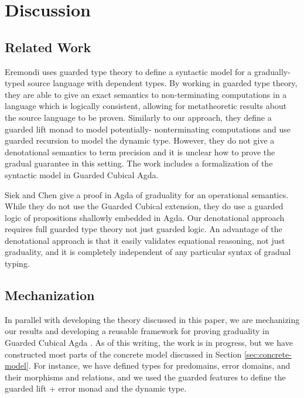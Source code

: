 \section{Discussion}\label{sec:discussion}

\subsection{Related Work}
Eremondi \cite{Eremondi_2023} uses guarded type theory to
define a syntactic model for a gradually-typed source
language with dependent types. By working in guarded type theory, they are
able to give an exact semantics to non-terminating computations in a language
which is logically consistent, allowing for metatheoretic results about the
source language to be proven.
%
Similarly to our approach, they define a guarded lift monad to model potentially-
nonterminating computations and use guarded recursion to model the dynamic type.
However, they do not give a denotational semantics to term precision and it is unclear
how to prove the gradual guarantee in this setting.
The work includes a formalization of the syntactic model in Guarded Cubical Agda.

Siek and Chen \cite{siek-chen2021} give a proof in Agda of graduality
for an operational semantics. While they do not use the Guarded
Cubical extension, they do use a guarded logic of propositions
shallowly embedded in Agda. Our denotational approach requires full
guarded type theory not just guarded logic. An advantage of the
denotational approach is that it easily validates equational
reasoning, not just graduality, and it is completely independent of
any particular syntax of gradual typing.

\subsection{Mechanization}
In parallel with developing the theory discussed in this paper,
we are mechanizing our results and developing a reusable framework
for proving graduality in Guarded Cubical Agda \cite{veltri-vezzosi2020}.
%
As of this writing, the work is in progress, but we have
constructed most parts of the concrete model discussed in
Section \ref{sec:concrete-model}. For instance, we have defined
types for predomains, error domains, and their morphisms and relations,
and we used the guarded features to define the guarded lift + error monad
and the dynamic type.

